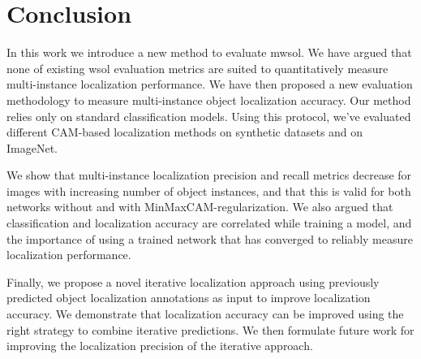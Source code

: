 \chapter{Conclusion}

In this work we introduce a new method to evaluate \acrfull{mwsol}. We have argued that none of existing \acrshort{wsol} evaluation metrics are suited to quantitatively measure multi-instance localization performance. We have then proposed a new evaluation methodology to measure multi-instance object localization accuracy. Our method relies only on standard classification models. Using this protocol, we've evaluated different CAM-based localization methods on synthetic datasets and on ImageNet.

We show that multi-instance localization precision and recall metrics decrease for images with increasing number of object instances, and that this is valid for both networks without and with MinMaxCAM-regularization. We also argued that classification and localization accuracy are correlated while training a model, and the importance of using a trained network that has converged to reliably measure localization performance.

Finally, we propose a novel iterative localization approach using previously predicted object localization annotations as input to improve localization accuracy. We demonstrate that localization accuracy can be improved using the right strategy to combine iterative predictions. We then formulate future work for improving the localization precision of the iterative approach.